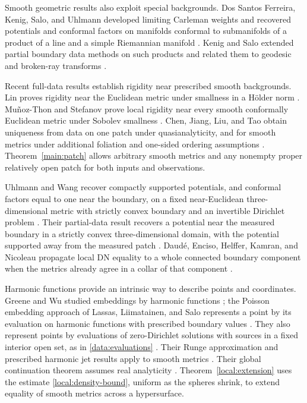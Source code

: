 \documentclass[11pt,a4paper]{article}
\theoremstyle{definition}
\theoremstyle{remark}
\numberwithin{equation}{section}
\begin{document}
Smooth geometric results also exploit special backgrounds.
Dos Santos Ferreira, Kenig, Salo, and Uhlmann developed limiting
Carleman weights and recovered potentials and conformal factors on
manifolds conformal to submanifolds of a product of a line and
a simple Riemannian manifold \cite{DSFKSU2009}. Kenig and Salo
extended partial boundary data methods on such products and related
them to geodesic and broken-ray transforms \cite{KenigSalo2013}.

Recent full-data results establish rigidity near prescribed smooth
backgrounds. Lin proves rigidity near the Euclidean metric under
smallness in a H\"older norm \cite[Theorem~1.1]{Lin2026}.
Mu\~noz-Thon and Stefanov prove local rigidity near every smooth
conformally Euclidean metric under Sobolev smallness
\cite[Theorem~2]{Stefanov2026}. Chen, Jiang, Liu, and Tao obtain
uniqueness from data on one patch under quasianalyticity, and for
smooth metrics under additional foliation and one-sided ordering
assumptions
\cite[Corollary~1.2, Theorem~1.6 and Corollary~1.7]{ChenJiangLiuTao2026}.
Theorem~\ref{main:patch} allows arbitrary smooth metrics and any
nonempty proper relatively open patch for both inputs and observations.

Uhlmann and Wang recover compactly supported potentials, and conformal
factors equal to one near the boundary, on a fixed near-Euclidean
three-dimensional metric with strictly convex boundary and an invertible
Dirichlet problem \cite{UhlmannWangNear2026}. Their partial-data result
recovers a potential near the measured boundary in a strictly convex
three-dimensional domain, with the potential supported away from the
measured patch \cite{UhlmannWangPartial2026}.
Daud\'e, Enciso, Helffer, Kamran, and Nicoleau propagate local DN
equality to a whole connected boundary component when the metrics
already agree in a collar of that component
\cite{DaudeEtAlPropagation2026}.

Harmonic functions provide an intrinsic way to describe points and
coordinates. Greene and Wu studied embeddings by harmonic functions
\cite{GreeneWu1975}; the Poisson embedding approach of Lassas,
Liimatainen, and Salo represents a point by its evaluation on
harmonic functions with prescribed boundary values \cite{LLS20}.
They also represent points by evaluations of zero-Dirichlet solutions
with sources in a fixed interior open set, as in
\eqref{data:evaluations}
\cite[Definition~6.1 and Proposition~6.8]{LLS20}. Their Runge
approximation and prescribed harmonic jet results apply to smooth
metrics \cite[Propositions~A.2 and A.5]{LLS20}. Their global continuation
theorem assumes real analyticity \cite[Theorem~3.3]{LLS20}.
Theorem~\ref{local:extension} uses the estimate
\eqref{local:density-bound}, uniform as the spheres shrink, to extend
equality of smooth metrics across a hypersurface.
\end{document}
